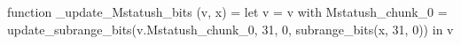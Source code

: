 function _update_Mstatush_bits (v, x) = let v = { v with Mstatush_chunk_0 = update_subrange_bits(v.Mstatush_chunk_0, 31, 0, subrange_bits(x, 31, 0)) } in
  v
